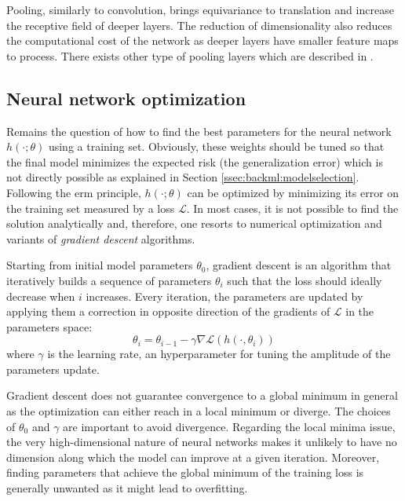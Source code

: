 Pooling, similarly to convolution, brings equivariance to translation and increase
the receptive field of deeper layers. The reduction of dimensionality also reduces
the computational cost of the network as deeper layers have smaller feature maps
to process. There exists other type of pooling layers which are described in
\parencite{gholamalinezhad2020pooling}.

\subsection{Neural network optimization}
\label{ssec:backml:dl:opti}
Remains the question of how to find the best parameters for the neural network
$h(\cdot; \theta)$ using a training set. Obviously, these weights should be tuned
so that the final model minimizes the expected risk (\ie the generalization error)
which is not directly possible as explained in Section \ref{ssec:backml:modelselection}.
Following the \acrshort{erm} principle, $h(\cdot; \theta)$ can be optimized by
minimizing its error on the training set measured by a loss $\mathcal{L}$. In most
cases, it is not possible to find the solution analytically and, therefore, one
resorts to numerical optimization and variants of \textit{gradient descent}
algorithms.

Starting from initial model parameters $\theta_0$, gradient descent is an algorithm
that iteratively builds a sequence of parameters $\theta_i$ such that the loss
should ideally decrease when $i$ increases. Every iteration, the parameters are
updated by applying them a correction in opposite direction of the gradients of
$\mathcal{L}$ in the parameters space:
\begin{equation}
\label{eqn:backml:gradientdescent}
\theta_{i} = \theta_{i-1} - \gamma \nabla \mathcal{L}(h(\cdot, \theta_{i}))
\end{equation}
where $\gamma$ is the learning rate, an hyperparameter for tuning the amplitude
of the parameters update.

Gradient descent does not guarantee convergence to a global minimum in general as
the optimization can either reach in a local minimum or diverge. The choices of
$\theta_0$ and $\gamma$ are important to avoid divergence. Regarding the local
minima issue, the very high-dimensional nature of neural networks makes it unlikely
to have no dimension along which the model can improve at a given iteration.
Moreover, finding parameters that achieve the global minimum of the training loss
is generally unwanted as it might lead to overfitting.


